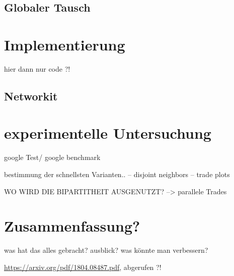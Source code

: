 \documentclass[a4paper]{scrreprt}
\theoremstyle{plain} %
\theoremstyle{definition} %
\begin{document}
\section{Globaler Tausch}










\chapter{Implementierung}
hier dann nur code ?! 

\section{Networkit}


\chapter{experimentelle Untersuchung}
google Test/ google benchmark


bestimmung der schnellsten Varianten..
-- disjoint neighbors
-- trade
plots


WO WIRD DIE BIPARTITHEIT AUSGENUTZT?
--> parallele Trades

\chapter{Zusammenfassung?}
was hat das alles gebracht?
ausblick?
was könnte man verbessern?


\begin{thebibliography}{2}
 \url{https://arxiv.org/pdf/1804.08487.pdf}, abgerufen ?!

\end{thebibliography}
\end{document}
